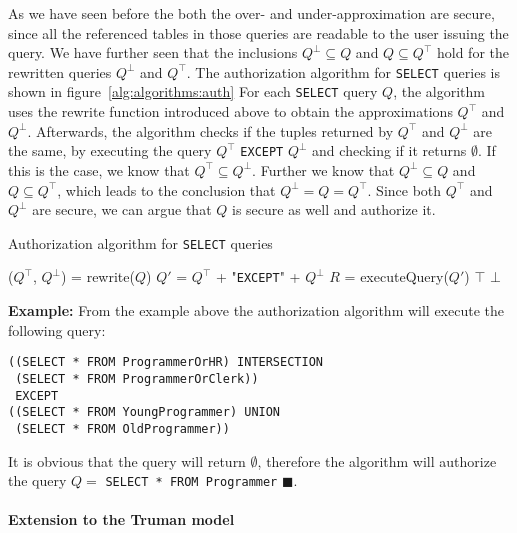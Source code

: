 As we have seen before the both the over- and under-approximation are secure, since all the referenced tables in those queries are readable to the user issuing the query.
%
We have further seen that the inclusions $Q^\bot \subseteq Q$ and $Q \subseteq Q^\top$ hold for the rewritten queries $Q^\bot$ and $Q^\top$.
%
The authorization algorithm for \texttt{SELECT} queries is shown in figure~\ref{alg:algorithms:auth}
%
For each \texttt{SELECT} query $Q$, the algorithm uses the rewrite function introduced above to obtain the approximations $Q^\top$ and $Q^\bot$.
%
Afterwards, the algorithm checks if the tuples returned by $Q^\top$ and $Q^\bot$ are the same, by executing the query  $Q^\top$ \texttt{EXCEPT} $Q^\bot$ and checking if it returns $\emptyset$.
%
If this is the case, we know that $Q^\top \subseteq Q^\bot$.
%
Further we know that $Q^\bot \subseteq Q$ and $Q \subseteq Q^\top$, which leads to the conclusion that $Q^\bot = Q = Q^\top$.
%
Since both $Q^\top$ and $Q^\bot$ are secure, we can argue that $Q$ is secure as well and authorize it.
%
\begin{algorithm}
\caption{Authorization algorithm for \texttt{SELECT} queries}
\label{alg:algorithms:auth}
	\SetAlgoLined
	($Q^\top$, $Q^\bot$) = rewrite($Q$)\;
	$Q'$ = $Q^\top$ + "\texttt{EXCEPT}" + $Q^\bot$\;
	$R$ = executeQuery($Q'$)\;
		{\Return $\top$ \;}
		{\Return $\bot$ \;}
\end{algorithm}

\smallskip
\noindent
{\bf Example:}
From the example above the authorization algorithm will execute the following query:
\begin{verbatim}
((SELECT * FROM ProgrammerOrHR) INTERSECTION
 (SELECT * FROM ProgrammerOrClerk))
 EXCEPT
((SELECT * FROM YoungProgrammer) UNION
 (SELECT * FROM OldProgrammer))
\end{verbatim}
\noindent
It is obvious that the query will return $\emptyset$, therefore the algorithm will authorize the query $Q = $ \texttt{SELECT * FROM Programmer} $\blacksquare$.

\paragraph{Extension to the Truman model}

